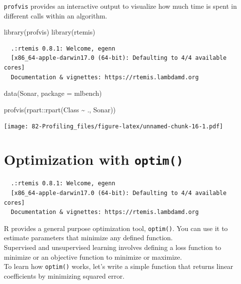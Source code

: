 \documentclass[
]{book}
\newenvironment{Shaded}{\begin{snugshade}}{\end{snugshade}}
\newcommand{\AttributeTok}[1]{\textcolor[rgb]{0.77,0.63,0.00}{#1}}
\newcommand{\FunctionTok}[1]{\textcolor[rgb]{0.00,0.00,0.00}{#1}}
\newcommand{\NormalTok}[1]{#1}
\newcommand{\SpecialCharTok}[1]{\textcolor[rgb]{0.00,0.00,0.00}{#1}}
\newcommand{\StringTok}[1]{\textcolor[rgb]{0.31,0.60,0.02}{#1}}
\begin{document}
\texttt{profvis} provides an interactive output to visualize how much time is spent in different calls within an algorithm.

\begin{Shaded}
\begin{Highlighting}[]
\FunctionTok{library}\NormalTok{(profvis)}
\FunctionTok{library}\NormalTok{(rtemis)}
\end{Highlighting}
\end{Shaded}

\begin{verbatim}
  .:rtemis 0.8.1: Welcome, egenn
  [x86_64-apple-darwin17.0 (64-bit): Defaulting to 4/4 available cores]
  Documentation & vignettes: https://rtemis.lambdamd.org
\end{verbatim}

\begin{Shaded}
\begin{Highlighting}[]
\FunctionTok{data}\NormalTok{(Sonar, }\AttributeTok{package =} \StringTok{\textquotesingle{}mlbench\textquotesingle{}}\NormalTok{)}
\end{Highlighting}
\end{Shaded}

\begin{Shaded}
\begin{Highlighting}[]
\FunctionTok{profvis}\NormalTok{(rpart}\SpecialCharTok{::}\FunctionTok{rpart}\NormalTok{(Class }\SpecialCharTok{\textasciitilde{}}\NormalTok{ ., Sonar))}
\end{Highlighting}
\end{Shaded}

\texttt{[image: 82-Profiling\_files/figure-latex/unnamed-chunk-16-1.pdf]}

\hypertarget{optim}{%
\chapter{\texorpdfstring{Optimization with \texttt{optim()}}{Optimization with optim()}}\label{optim}}

\begin{verbatim}
  .:rtemis 0.8.1: Welcome, egenn
  [x86_64-apple-darwin17.0 (64-bit): Defaulting to 4/4 available cores]
  Documentation & vignettes: https://rtemis.lambdamd.org
\end{verbatim}

R provides a general purpose optimization tool, \texttt{optim()}. You can use it to estimate parameters that minimize any defined function.\\
Supervised and unsupervised learning involves defining a loss function to minimize or an objective function to minimize or maximize.\\
To learn how \texttt{optim()} works, let's write a simple function that returns linear coefficients by minimizing squared error.
\end{document}
